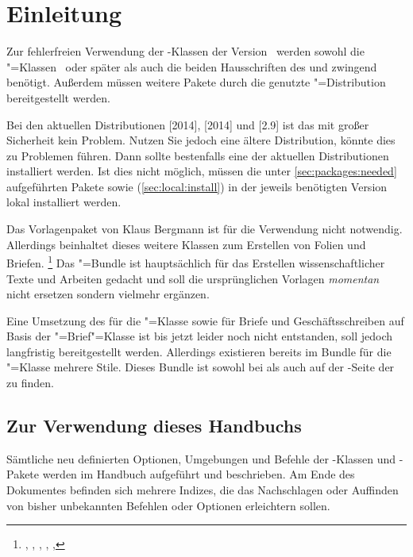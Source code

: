 \chapter{Einleitung}
Zur fehlerfreien Verwendung der \TUDScript-Klassen der Version~\vTUDScript{} 
werden sowohl die \KOMAScript"=Klassen~\vKOMAScript{} oder später als auch die 
beiden Hausschriften des \CDs \Univers und \DIN zwingend benötigt. Außerdem 
müssen weitere Pakete durch die genutzte "=Distribution 
bereitgestellt werden. 

Bei den aktuellen Distributionen [2014], 
[2014] und [2.9] 
ist das mit großer Sicherheit kein Problem. Nutzen Sie jedoch eine ältere 
Distribution, könnte dies zu Problemen führen. Dann sollte bestenfalls eine der 
aktuellen Distributionen installiert werden. Ist dies nicht möglich, müssen die 
unter \autoref{sec:packages:needed} aufgeführten Pakete sowie \TUDScript 
(\autoref{sec:local:install}) in der jeweils benötigten Version lokal 
installiert werden.

Das Vorlagenpaket von Klaus Bergmann ist für die Verwendung nicht notwendig. 
Allerdings beinhaltet dieses weitere Klassen zum Erstellen von Folien 
und Briefen.%
\footnote{%
  , , , , 
  , 
}
Das \TUDScript"=Bundle ist hauptsächlich für das Erstellen wissenschaftlicher 
Texte und Arbeiten gedacht und soll die ursprünglichen Vorlagen \emph{momentan} 
nicht ersetzen sondern vielmehr ergänzen. 

Eine Umsetzung des \CDs für die "=Klasse sowie für Briefe und 
Geschäftsschreiben auf Basis der \KOMAScript"=Brief"=Klasse  
ist bis jetzt leider noch nicht entstanden, soll jedoch langfristig 
bereitgestellt werden. Allerdings existieren bereits im Bundle 
 für die "=Klasse mehrere Stile. Dieses 
Bundle ist sowohl bei  als 
auch auf der  
{-Seite der \TnUD} zu finden.



\section{Zur Verwendung dieses Handbuchs}
Sämtliche neu definierten Optionen, Umgebungen und Befehle der 
\TUDScript-Klassen und \TUDScript-Pakete werden im Handbuch aufgeführt und 
beschrieben. Am Ende des Dokumentes befinden sich mehrere Indizes, die das 
Nachschlagen oder Auffinden von bisher unbekannten Befehlen oder Optionen 
erleichtern sollen.

